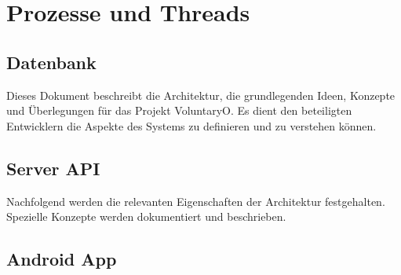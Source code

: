 \chapter{Prozesse und Threads}
	\section{Datenbank}
	Dieses Dokument beschreibt die Architektur, die grundlegenden Ideen, Konzepte und Überlegungen für das Projekt VoluntaryO. Es dient den beteiligten Entwicklern die Aspekte des Systems zu definieren und zu verstehen können.
	
	
	\section{Server API}
	Nachfolgend werden die relevanten Eigenschaften der Architektur festgehalten. Spezielle Konzepte werden dokumentiert und beschrieben.

	\section{Android App}